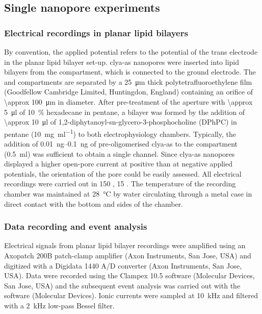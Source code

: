 \subsection{Single nanopore experiments}
%
\label{sec:trapping_appendix:nanopore_experiments}
%

\subsubsection{Electrical recordings in planar lipid bilayers}
%

By convention, the applied potential refers to the potential of the trans electrode in the planar lipid
bilayer set-up. \gls{clya-as} nanopores were inserted into lipid bilayers from the \cisi{} compartment, which
is connected to the ground electrode. The \cisi{} and \transi{} compartments are separated by a
\SI{25}{\micro\meter} thick polytetrafluoroethylene film (Goodfellow Cambridge Limited, Huntingdon, England)
containing an orifice of \SI{\approx 100}{\micro\meter} in diameter. After pre-treatment of the aperture with
\SI{\approx 5}{\micro\litre} of \SI{10}{\percent} hexadecane in pentane, a bilayer was formed by the addition
of \SI{\approx 10}{\micro\litre} of 1,2-diphytanoyl-sn-glycero-3-phosphocholine (DPhPC) in pentane
(\SI{10}{\milli\gram\per\milli\litre}) to both electrophysiology chambers. Typically, the addition of
\SIrange{0.01}{0.1}{\nano\gram} of pre-oligomerised \gls{clya-as} to the \cisi{} compartment
(\SI{0.5}{\milli\litre}) was sufficient to obtain a single channel. Since \gls{clya-as} nanopores displayed a
higher open-pore current at positive than at negative applied potentials, the orientation of the pore could be
easily assessed. All electrical recordings were carried out in \SI{150}{\mM} , \SI{15}{\mM}
 . The temperature of the recording chamber was maintained at \SI{28}{\celsius} by water
circulating through a metal case in direct contact with the bottom and sides of the chamber.


\subsubsection{Data recording and event analysis}
%

Electrical signals from planar lipid bilayer recordings were amplified using an Axopatch 200B patch-clamp
amplifier (Axon Instruments, San Jose, USA) and digitized with a Digidata 1440 A/D converter (Axon
Instruments, San Jose, USA). Data were recorded using the Clampex 10.5 software (Molecular Devices, San Jose,
USA) and the subsequent event analysis was carried out with the  software (Molecular Devices).
Ionic currents were sampled at \SI{10}{\kilo\hertz} and filtered with a \SI{2}{\kilo\hertz} low-pass Bessel
filter.

